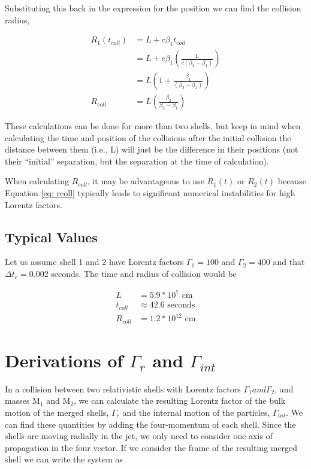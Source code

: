 \documentclass[linenumbers,twocolumn]{aastex631}
\begin{document}
\begin{appendix}
Substituting this back in the expression for the position we can find the collision radius, 

\begin{align}
	R_1(t_{coll}) &= L + c\beta_1 t_{coll} \\
	&= L+c\beta_1\left(\frac{L}{c(\beta_2-\beta_1)}\right) \\
	&= L\left(1+\frac{\beta_1}{(\beta_2-\beta_1)}\right)\\
	R_{coll} &= L\left(\frac{\beta_2}{\beta_2-\beta_1}\right) \label{eq: rcoll}
\end{align}

These calculations can be done for more than two shells, but keep in mind when calculating the time and position of the collisions after the initial collision the distance between them (i.e., L) will just be the difference in their positions (not their ``initial'' separation, but the separation at the time of calculation).

When calculating $R_{coll}$, it may be advantageous to use $R_1(t)$ or $R_2(t)$
because Equation \ref{eq: rcoll} typically leads to significant numerical instabilities for high Lorentz factors.

\subsection{Typical Values}

Let us assume shell 1 and 2 have Lorentz factors $\Gamma_1=100$ and $\Gamma_2=400$ and that $\Delta t_e = 0.002$ seconds. The time and radius of collision would be

\begin{align}
	L &= 5.9 * 10^7 \text{ cm} \\ 
	t_{coll} &\approx 42.6 \text{ seconds}\\
	R_{coll} &= 1.2*10^{12} \text{ cm}
\end{align}


\section[Derivations of Gamma_r and Gamma_int]{Derivations of $\Gamma_r$ and $\Gamma_{int}$}

In a collision between two relativistic shells with Lorentz factors $\Gamma_1 and \Gamma_2$, and masses M$_1$ and M$_2$, we can calculate the resulting Lorentz factor of the bulk motion of the merged shells, $\Gamma_r$ and the internal motion of the particles, $\Gamma_{int}$. We can find these quantities by adding the four-momentum of each shell. Since the shells are moving radially in the jet, we only need to consider one axis of propagation in the four vector. If we consider the frame of the resulting merged shell we can write the system as


\end{appendix}
\end{document}
